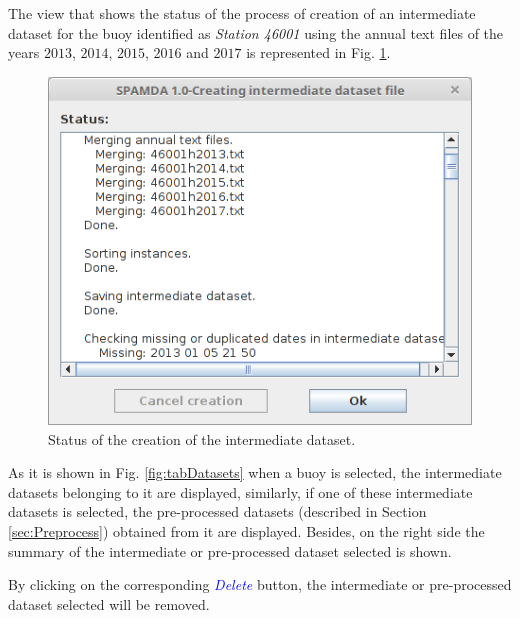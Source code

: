 \begin{onehalfspace}
				The view that shows the status of the process of creation of an intermediate dataset for the buoy identified as \textit{Station 46001} using the annual text files of the years $2013$, $2014$, $2015$, $2016$ and $2017$ is represented in Fig. \ref{fig:statusCreationIntermediateDataset}.
			
					\begin{figure}[ht!]
						\centering
						\includegraphics[scale=0.39]{figures/statusCreationIntermediateDataset.png}
						\caption{Status of the creation of the intermediate dataset.}
						\label{fig:statusCreationIntermediateDataset}
					\end{figure}
					
				
				As it is shown in Fig. \ref{fig:tabDatasets} when a buoy is selected, the intermediate datasets belonging to it are displayed, similarly, if one of these intermediate datasets  is selected, the pre-processed datasets (described in Section \ref{sec:Preprocess}) obtained from it are displayed. Besides, on the right side the summary of the intermediate or pre-processed dataset selected is shown.
				
				By clicking on the corresponding \textcolor{blue}{\textit{Delete}} button, the intermediate or pre-processed dataset selected will be removed.
				

\end{onehalfspace}
